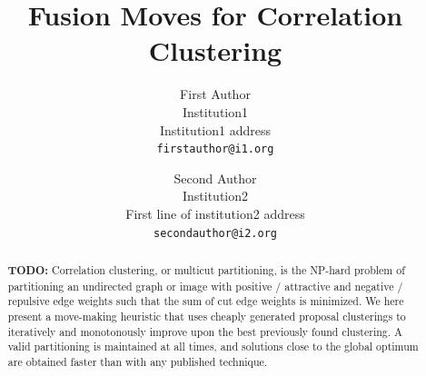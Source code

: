 \documentclass[10pt,twocolumn,letterpaper]{article}
\theoremstyle{definition}
\begin{document}

\title{Fusion Moves for Correlation Clustering}

\author{First Author\\
Institution1\\
Institution1 address\\
{\tt\small firstauthor@i1.org}
\and
Second Author\\
Institution2\\
First line of institution2 address\\
{\tt\small secondauthor@i2.org}
}

\maketitle


\begin{abstract}
  \color{red} \textbf{TODO:}
Correlation clustering, or multicut partitioning, is the NP-hard problem of partitioning an undirected graph or image with positive / attractive and negative / repulsive edge weights such that the sum of cut edge weights is minimized. We here present a move-making heuristic that uses cheaply generated proposal clusterings to iteratively and monotonously improve upon the best previously found clustering. A valid partitioning is maintained at all times, and solutions close to the global optimum are obtained faster than with any published technique. 
    

\end{abstract}
\end{document}
